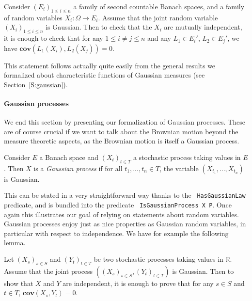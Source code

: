 \documentclass[lean]{Draft}
\makeatletter
\renewcommand{\lean}[1]{\lstinline| #1|}
\newcommand\leanlink{\begingroup\catcode`\#=12\relax\@leanlink}
\newcommand\@leanlink[2]{\endgroup
\href{#1}
{\texttt{\detokenize{#2}}}}
\newcommand{\mllink}[3]{%
\leanlink{https://github.com/leanprover-community/mathlib4/blob/6135ffb78e8bcd3fcc8ec02f3f82ea0b0737358b/Mathlib/#1.lean\##2}
{#3}}
\newcommand{\bmlink}[3]{%
\leanlink{https://github.com/RemyDegenne/brownian-motion/blob/8fd8dc52830cdd07cf9cc8eadd533e284425fa6f/BrownianMotion/#1.lean\##2}
{#3}}
\makeatother
\begin{document}
\begin{lemma}[\mllink{Probability/Distributions/Gaussian/HasGaussianLaw/Independence}{L191-L195}{HasGaussianLaw.iIndepFun_of_covariance_strongDual}]\label{lem:gauss-indep}
  Consider $(E_i)_{1 \le i \le n}$ a family of second countable Banach spaces, and a family of random variables $X_i : \Omega \to E_i$. Assume that the joint random variable $(X_i)_{1 \le i \le n}$ is Gaussian. Then to check that the $X_i$ are mutually independent, it is enough to check that for any $1 \le i \ne j \le n$ and any $L_1 \in E_i'$, $L_2 \in E_j'$, we have $\mathbf{cov}(L_1(X_i), L_2(X_j)) = 0$.
\end{lemma}

This statement follows actually quite easily from the general results we formalized about characteristic functions of Gaussian measures (see Section~\ref{S:gaussian}).

\paragraph{Gaussian processes}

We end this section by presenting our formalization of Gaussian processes. These are of course crucial if we want to talk about the Brownian motion beyond the measure theoretic aspects, as the Brownian motion is itself a Gaussian process.

\begin{definition}[\mllink{Probability/Distributions/Gaussian/IsGaussianProcess/Def}{L27-L33}{ProbabilityTheory.IsGaussianProcess}]\label{def:guass-proc}
  Consider $E$ a Banach space and $(X_t)_{t \in T}$ a stochastic process taking values in $E$. Then $X$ is a \emph{Gaussian process} if for all $t_1, ..., t_n \in T$, the variable $(X_{t_1}, ..., X_{t_n})$ is Gaussian.
\end{definition}

This can be stated in a very straightforward way thanks to the \lean{HasGaussianLaw} predicate, and is bundled into the predicate \lean{IsGaussianProcess X P}. Once again this illustrates our goal of relying on statements about random variables. Gaussian processes enjoy just as nice properties as Gaussian random variables, in particular with respect to independence. We have for example the following lemma.

\begin{lemma}[\bmlink{Gaussian/GaussianProcess}{L28-L31}{IsGaussianProcess.indepFun''}]\label{lem:indepGaussProc}
  Let $(X_s)_{s \in S}$ and $(Y_t)_{t \in T}$ be two stochastic processes taking values in $\mathbb{R}$. Assume that the joint process $((X_s)_{s \in S}, (Y_t)_{t \in T})$ is Gaussian. Then to show that $X$ and $Y$ are independent, it is enough to prove that for any $s \in S$ and $t \in T$, $\mathbf{cov}(X_s, Y_t) = 0$.
\end{lemma}
\end{document}
